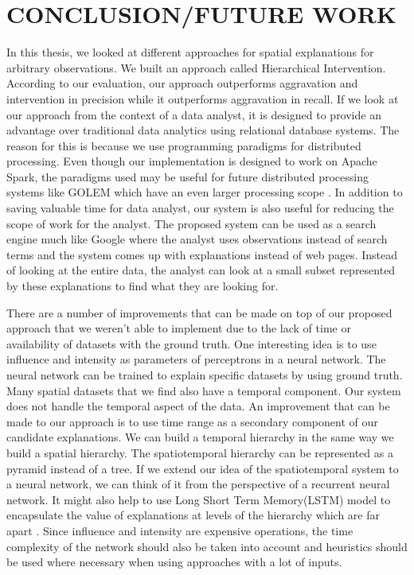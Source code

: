 \chapter{CONCLUSION/FUTURE WORK}
\label{chp:concl}
In this thesis, we looked at different approaches for spatial explanations for arbitrary observations. We built an approach called Hierarchical Intervention. According to our evaluation, our approach outperforms aggravation and intervention in precision while it outperforms aggravation in recall. If we look at our approach from the context of a data analyst, it is designed to provide an advantage over traditional data analytics using relational database systems. The reason for this is because we use programming paradigms for distributed processing. Even though our implementation is designed to work on Apache Spark, the paradigms used may be useful for future distributed processing systems like GOLEM which have an even larger processing scope \citep{golem2018}. In addition to saving valuable time for data analyst, our system is also useful for reducing the scope of work for the analyst. The proposed system can be used as a search engine much like Google where the analyst uses observations instead of search terms and the system comes up with explanations instead of web pages. Instead of looking at the entire data, the analyst can look at a small subset represented by these explanations to find what they are looking for.

There are a number of improvements that can be made on top of our proposed approach that we weren't able to implement due to the lack of time or availability of datasets with the ground truth. One interesting idea is to use influence and intensity as parameters of perceptrons in a neural network\citep{grossberg1988nonlinear,widrow199030}. The neural network can be trained to explain specific datasets by using ground truth.
Many spatial datasets that we find also have a temporal component. Our system does not handle the temporal aspect of the data. An improvement that can be made to our approach is to use time range as a secondary component of our candidate explanations. We can build a temporal hierarchy in the same way we build a spatial hierarchy. The spatiotemporal hierarchy can be represented as a pyramid instead of a tree.
If we extend our idea of the spatiotemporal system to a neural network, we can think of it from the perspective of a recurrent neural network\citep{chung2016hierarchical}. It might also help to use Long Short Term Memory(LSTM) model to encapsulate the value of explanations at levels of the hierarchy which are far apart \citep{hochreiter1997long}.
Since influence and intensity are expensive operations, the time complexity of the network should also be taken into account and heuristics should be used where necessary when using approaches with a lot of inputs.
